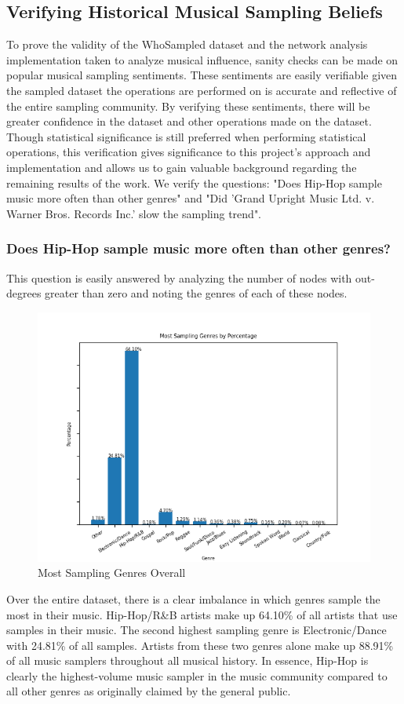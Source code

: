 \documentclass[pageno]{jpaper}
\begin{document}
\subsection{Verifying Historical Musical Sampling Beliefs}
To prove the validity of the WhoSampled dataset and the network analysis implementation taken to analyze musical influence, sanity checks can be made on popular musical sampling sentiments. These sentiments are easily verifiable given the sampled dataset the operations are performed on is accurate and reflective of the entire sampling community. By verifying these sentiments, there will be greater confidence in the dataset and other operations made on the dataset. Though statistical significance is still preferred when performing statistical operations, this verification gives significance to this project's approach and implementation and allows us to gain valuable background regarding the remaining results of the work. We verify the questions: "Does Hip-Hop sample music more often than other genres" and "Did 'Grand Upright Music Ltd. v. Warner Bros. Records Inc.' slow the sampling trend".
\subsubsection{Does Hip-Hop sample music more often than other genres?}
This question is easily answered by analyzing the number of nodes with out-degrees greater than zero and noting the genres of each of these nodes.  
\begin{figure}[H]
\includegraphics{topSamplingGenresPercent}
\caption{Most Sampling Genres Overall}
\centering
\end{figure}
Over the entire dataset, there is a clear imbalance in which genres sample the most in their music. Hip-Hop/R\&B artists make up 64.10\% of all artists that use samples in their music. The second highest sampling genre is Electronic/Dance with 24.81\% of all samples. Artists from these two genres alone make up 88.91\% of all music samplers throughout all musical history. In essence, Hip-Hop is clearly the highest-volume music sampler in the music community compared to all other genres as originally claimed by the general public. 
\end{document}
